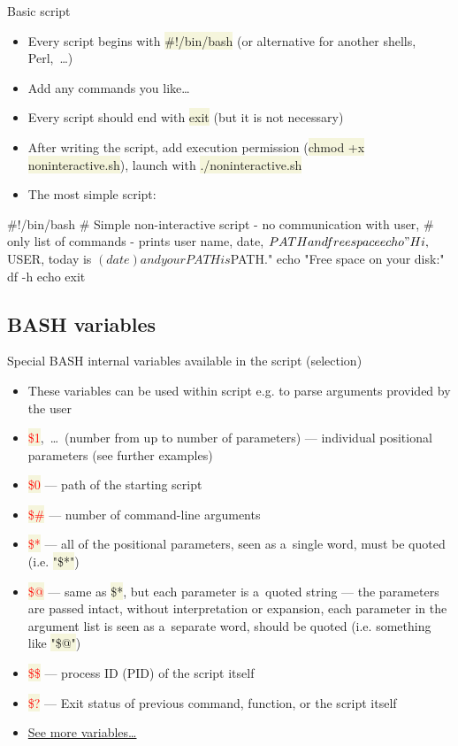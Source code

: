 \documentclass[compress, xelatex, 11pt, xcolor=svgnames, aspectratio=169,
	hyperref={
		bookmarks=true,
		unicode=true,
		colorlinks=true,
		pdftitle={Linux, command line and MetaCentrum},
		plainpages=false,
		pdfauthor={Vojtech Zeisek},
		pdfsubject={Course about use of Linux command line, writing shell scripts and using MetaCentrum of CESNET},
		pdfcreator={XeLaTeX},
		pdfkeywords={Linux, GNU, BASH, shell, command line, MetaCentrum},
		linkcolor=DarkRed, %
		anchorcolor=DarkBlue, %
		citecolor=Indigo, %
		filecolor=NavyBlue, %
		menucolor=DarkMagenta, %
		urlcolor=DarkBlue, %
		},
	url={hyphens, lowtilde} %
	]{beamer}
\renewcommand{\texttt}[1]{\colorbox{Beige}{{\ttfamily #1}}}
\renewcommand{\alert}[1]{\textcolor{red}{#1}}
\begin{document}
\begin{frame}[fragile]{Basic script}
	\begin{itemize}
		\item Every script begins with \texttt{\#!/bin/bash} (or alternative for another shells, Perl,~\ldots)
		\item Add any commands you like\ldots
		\item Every script should end with \texttt{exit} (but it is not necessary)
		\item After writing the script, add execution permission (\texttt{chmod +x noninteractive.sh}), launch with \texttt{./noninteractive.sh}
		\item The most simple script:
	\end{itemize}
	\vfill
	\begin{bashcode}
    #!/bin/bash
    # Simple non-interactive script - no communication with user,
    # only list of commands - prints user name, date, $PATH and free space
    echo "Hi, ${USER}, today is $(date) and your PATH is ${PATH}."
    echo "Free space on your disk:"
    df -h
    echo
    exit
	\end{bashcode}
\end{frame}

\subsection{BASH variables}

\begin{frame}{Special BASH internal variables available in the script (selection)}
	\begin{itemize}
		\item These variables can be used within script e.g. to parse arguments provided by the user
		\item \alert{\texttt{\$1}},~\ldots~(number from \texttt{1} up to number of parameters) --- individual positional parameters (see further examples)
		\item \alert{\texttt{\$0}} --- path of the starting script
		\item \alert{\texttt{\$\#}} --- number of command-line arguments
		\item \alert{\texttt{\$*}} --- all of the positional parameters, seen as a~single word, must be quoted (i.e. \texttt{"\$*"})
		\item \alert{\texttt{\$@}} --- same as \texttt{\$*}, but each parameter is a~quoted string --- the parameters are passed intact, without interpretation or expansion, each parameter in the argument list is seen as a~separate word, should be quoted (i.e. something like \texttt{"\$@"})
		\item \alert{\texttt{\$\$}} --- process ID (PID) of the script itself
		\item \alert{\texttt{\$?}} --- Exit status of previous command, function, or the script itself
		\item \href{https://tldp.org/LDP/abs/html/internalvariables.html}{See more variables\ldots}
	\end{itemize}
\end{frame}
\end{document}
